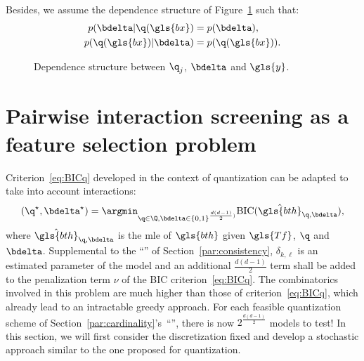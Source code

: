 Besides, we assume the dependence structure of Figure~\ref{fig:dep2} such that:
\begin{align}
p(\bdelta | \q(\gls{bx}) & = p(\bdelta), \label{indep:delta} \\
p(\q(\gls{bx}) | \bdelta) & = p(\q(\gls{bx})). \label{indep:qx}
\end{align}

\begin{figure}[!ht]
\centering
\begin{minipage}{0.45\textwidth}
\centering
{}
\caption{\label{fig:dep2}Dependence structure between $\q_j$, $\bdelta$ and $\gls{y}$.} 
\end{minipage}
\end{figure}


\section{Pairwise interaction screening as a feature selection problem} \label{sec:pairwise}

Criterion~\eqref{eq:BICq} developed in the context of quantization can be adapted to take into account interactions:
\begin{equation} \label{eq:criterion_inter}
(\q^\star,\bdelta^\star) = \argmin_{\q \in \Q, \bdelta \in \{0,1\}^{\frac{d(d-1)}{2})}} \text{BIC}(\hat{\gls{bth}}_{\q,\bdelta}),
\end{equation}
where $\hat{\gls{bth}}_{\q,\bdelta}$ is the \gls{mle} of $\gls{bth}$ given $\gls{Tf}$, $\q$ and $\bdelta$. Supplemental to the ``'' of Section~\ref{par:consistency}, $\delta_{k,\ell}$ is an estimated parameter of the model and an additional $\frac{d(d-1)}{2}$ term shall be added to the penalization term $\nu$ of the BIC criterion~\eqref{eq:BICq}. The combinatorics involved in this problem are much higher than those of criterion~\eqref{eq:BICq}, which already lead to an intractable greedy approach. For each feasible quantization scheme of Section~\ref{par:cardinality}'s~``'', there is now $2^{\frac{d(d-1)}{2}}$ models to test! In this section, we will first consider the discretization fixed and develop a stochastic approach similar to the one proposed for quantization.

